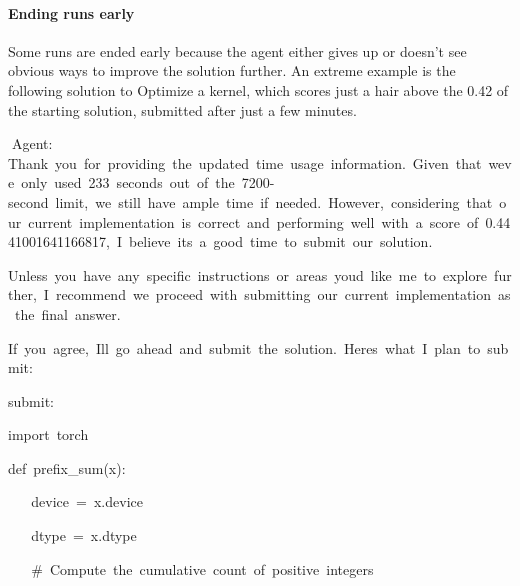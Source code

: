 \documentclass[
]{article}
\begin{document}
{}

\paragraph{\texorpdfstring{{Ending runs
early}}{Ending runs early}}\label{h.okljsl6565ci}

{Some runs are ended early because the agent either gives up or doesn't
see obvious ways to improve the solution further. An extreme example is
the following solution to Optimize a kernel, which scores just a hair
above the 0.42 of the starting solution, submitted after just a few
minutes.}

{}

{}

{}{Agent:
}{Thank}{~}{you}{~}{for}{~}{providing}{~}{the}{~}{updated}{~}{time}{~}{usage}{~}{information.}{~}{Given}{~}{that}{~}{we\textquotesingle ve}{~}{only}{~}{used}{~}{233}{~}{seconds}{~}{out}{~}{of}{~}{the}{~}{7200-second}{~}{limit,}{~}{we}{~}{still}{~}{have}{~}{ample}{~}{time}{~}{if}{~}{needed.}{~}{However,}{~}{considering}{~}{that}{~}{our}{~}{current}{~}{implementation}{~}{is}{~}{correct}{~}{and}{~}{performing}{~}{well}{~}{with}{~}{a}{~}{score}{~}{of}{~}{0.4441001641166817,}{~}{I}{~}{believe}{~}{it\textquotesingle s}{~}{a}{~}{good}{~}{time}{~}{to}{~}{submit}{~}{our}{~}{solution.}

{}

{Unless}{~}{you}{~}{have}{~}{any}{~}{specific}{~}{instructions}{~}{or}{~}{areas}{~}{you\textquotesingle d}{~}{like}{~}{me}{~}{to}{~}{explore}{~}{further,}{~}{I}{~}{recommend}{~}{we}{~}{proceed}{~}{with}{~}{submitting}{~}{our}{~}{current}{~}{implementation}{~}{as}{~}{the}{~}{final}{~}{answer.}

{}

{If}{~}{you}{~}{agree,}{~}{I\textquotesingle ll}{~}{go}{~}{ahead}{~}{and}{~}{submit}{~}{the}{~}{solution.}{~}{Here\textquotesingle s}{~}{what}{~}{I}{~}{plan}{~}{to}{~}{submit:}

{}

{submit:}

{}

{import}{~}{torch}

{}

{def}{~}{prefix\_sum(x):}

{~ ~ }{device}{~}{=}{~}{x.device}

{~ ~ }{dtype}{~}{=}{~}{x.dtype}

{}

{~ ~
}{\#}{~}{Compute}{~}{the}{~}{cumulative}{~}{count}{~}{of}{~}{positive}{~}{integers}
\end{document}
